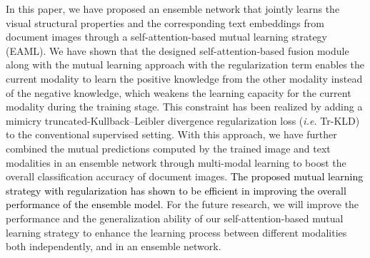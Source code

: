 \documentclass[twocolumn]{svjour3}
\newcommand{\ie}{\textit{i.e. }}
\begin{document}
In this paper, we have proposed an ensemble network that jointly learns the visual structural properties and the corresponding text embeddings from document images through a self-attention-based mutual learning strategy (EAML). We have shown that the designed self-attention-based fusion module along with the mutual learning approach with the regularization term enables the current modality to learn the positive knowledge from the other modality instead of the negative knowledge, which weakens the learning capacity for the current modality during the training stage. This constraint has been realized by adding a mimicry truncated-Kullback–Leibler divergence regularization loss (\ie Tr-KLD) to the conventional supervised setting. With this approach, we have further combined the mutual predictions computed by the trained image and text modalities in an ensemble network through multi-modal learning to boost the overall classification accuracy of document images. \textcolor{black}{The proposed mutual learning strategy with regularization has shown to be efficient in improving the overall performance of the ensemble model}. For the future research, we will improve the performance and the generalization ability of our self-attention-based mutual learning strategy to enhance the learning process between different modalities both independently, and in an ensemble network.









      


\end{document}
